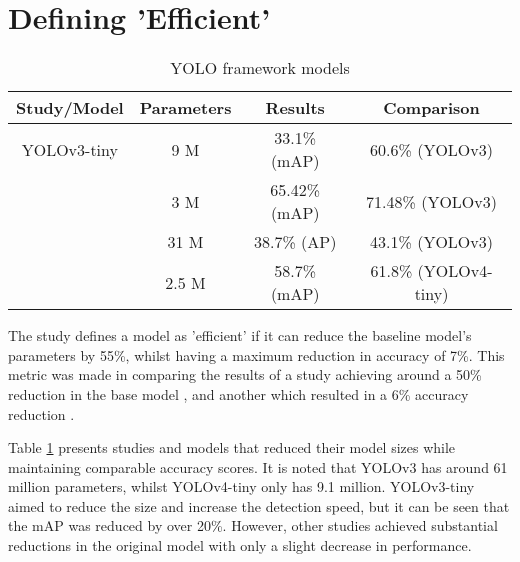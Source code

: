 \section{Defining 'Efficient'} \label{efficient}

\begin{table}[!htbp]
    \centering
    \caption{YOLO framework models}
    \resizebox{0.85\linewidth}{!}
    {
    \begin{tabular}{c c c c}
        \hline
        Study/Model & Parameters & Results & Comparison\\
        \hline
        YOLOv3-tiny & 9 M & 33.1\% (mAP) & 60.6\% (YOLOv3)\\
        \hline
        \cite{chakarDepthwiseSeparableConvolutions2020} & 3 M & 65.42\% (mAP) & 71.48\% (YOLOv3)\\
        \hline
        \cite{liYOLOv3LiteLightweightCrack2019} & 31 M &  38.7\% (AP) & 43.1\% (YOLOv3)\\
        \hline
        \cite{liberatoriYOLOBasedFaceMask2022} & 2.5 M & 58.7\% (mAP) & 61.8\% (YOLOv4-tiny) \\
        \hline
        
    \end{tabular}
    }
    \label{tab:'efficient'-examples}
\end{table}

The study defines a model as 'efficient' if it can reduce the baseline model's parameters by 55\%, whilst having a maximum reduction in accuracy of 7\%. This metric was made in comparing the results of a study achieving around a 50\% reduction in the base model \cite{liYOLOv3LiteLightweightCrack2019}, and another which resulted in a 6\% accuracy reduction \cite{chakarDepthwiseSeparableConvolutions2020}.

Table \ref{tab:'efficient'-examples} presents studies and models that reduced their model sizes while maintaining comparable accuracy scores. It is noted that YOLOv3 has around 61 million parameters, whilst YOLOv4-tiny only has 9.1 million. \break
YOLOv3-tiny aimed to reduce the size and increase the detection speed, but it can be seen that the mAP was reduced by over 20\%. However, other studies achieved substantial reductions in the original model with only a slight decrease in performance. 

